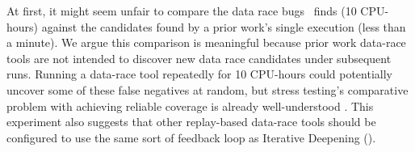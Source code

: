 At first, it might seem unfair to compare the data race bugs \quicksand~finds (10 CPU-hours)
against the candidates found by a prior work's single execution (less than a minute).
We argue this comparison is meaningful because prior work data-race tools %
are not intended to discover new data race candidates under subsequent runs. %
Running a data-race tool repeatedly for 10 CPU-hours could potentially uncover some of these false negatives at random,
but stress testing's comparative problem with achieving reliable coverage is already well-understood
\cite{chess-icb,gambit}.
This experiment also suggests that
other replay-based data-race tools \cite{racefuzzer,portend} should be configured to use the same sort of feedback loop as Iterative Deepening (\sect{\ref{sec:related-dr}}).




